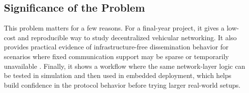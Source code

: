 \subsection{Significance of the Problem}

This problem matters for a few reasons. For a final-year project, it gives a low-cost and reproducible way to
study decentralized vehicular networking. It also provides practical evidence of infrastructure-free
dissemination behavior for scenarios where fixed communication support may be sparse or temporarily
unavailable \cite{lora_mesh_emergency,lora_reliable_v2v_2025}. Finally, it shows a workflow where the same
network-layer logic can be tested in simulation and then used in embedded deployment, which helps build
confidence in the protocol behavior before trying larger real-world setups.

